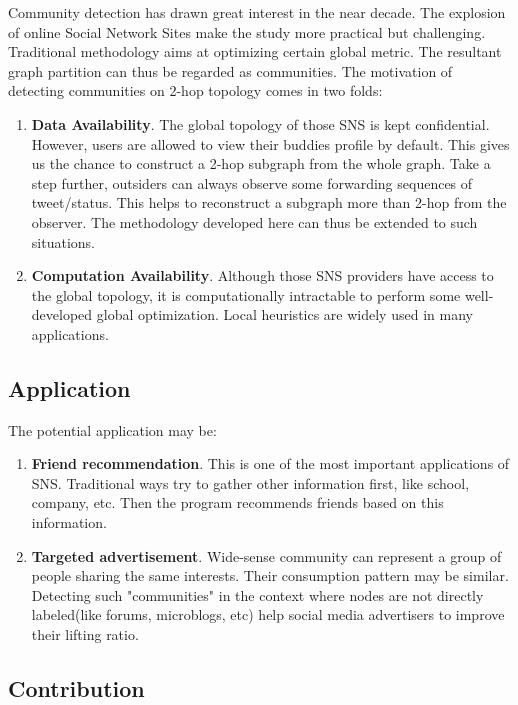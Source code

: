 \documentclass[11pt,a4paper]{article}
\begin{document}
Community detection has drawn great interest in the near decade. 
The explosion of online Social Network Sites make the study more 
practical but challenging. Traditional methodology aims at 
optimizing certain global metric. The resultant graph partition 
can thus be regarded as communities. The motivation of detecting 
communities on 2-hop topology comes in two folds: 
\begin{enumerate}
	\item \textbf{Data Availability}. The global topology of 
	those SNS is kept confidential. However, users are allowed 
	to view their buddies profile by default. This gives us the 
	chance to construct a 2-hop subgraph from the whole graph. 
	Take a step further, outsiders can always observe some forwarding 
	sequences of tweet/status. This helps to reconstruct a 
	subgraph more than 2-hop from the observer. The methodology 
	developed here can thus be extended to such situations. 
	\item \textbf{Computation Availability}. Although those SNS 
	providers have access to the global topology, it is computationally
	intractable to perform some well-developed global optimization. 
	Local heuristics are widely used in many applications. 
\end{enumerate}

\subsection{Application}

The potential application may be:
\begin{enumerate}
	\item \textbf{Friend recommendation}. This is one of the 
	most important applications of SNS. Traditional ways
	try to gather other information first, like school, company, etc. 
	Then the program recommends friends based on this information.  
	\item \textbf{Targeted advertisement}. Wide-sense community 
	can represent a group of people sharing the same interests. Their
	consumption pattern may be similar. Detecting such "communities"
	in the context where nodes are not directly labeled(like forums, 
	microblogs, etc) help social media advertisers to improve 
	their lifting ratio. 
\end{enumerate}

\subsection{Contribution}
\end{document}
